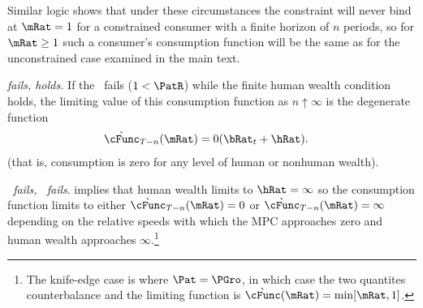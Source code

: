 \documentclass[\econtexRoot/BufferStockTheory]{subfiles}
\begin{document}
Similar logic shows that under these circumstances the constraint will
never bind at $\mRat=1$ for a constrained consumer with a finite horizon of $n$
periods, so for $\mRat \geq 1$ such a consumer's consumption function will be the same as for the
unconstrained case examined in the main text.

\hypertarget{cnclPFGICcnclRICFHWC}{}
\textit{{\RIC} fails, {\FHWC} holds.} If the \RIC~fails ($1 < \PatR$) while the finite human wealth condition
holds, the limiting value of this consumption function as $n \uparrow
\infty$ is the degenerate function
\begin{equation}\begin{gathered}\begin{aligned}
  \grave{\cFunc}_{T-n}(\mRat)  & = 0 (\bRat_{t}+\hRat).
\end{aligned}\end{gathered}\end{equation}
(that is, consumption is zero for any level of human or nonhuman wealth).

\hypertarget{cnclPFGICcnclRICcnclFHWC}{}
\textit{{\RIC}~fails, {\FHWC}~fails}. {\cncl{\FHWC}} implies that human wealth limits to $\hRat =
\infty$ so the consumption function limits to either
$\grave{\cFunc}_{T-n}(\mRat) = 0$ or
$\grave{\cFunc}_{T-n}(\mRat) = \infty$ depending on the relative
speeds with which the MPC approaches zero and human wealth approaches
$\infty$.\footnote{The knife-edge case is where $\Pat = \PGro$, in
  which case the two quantites counterbalance and the limiting
  function is $\grave{\cFunc}(\mRat)=\min[\mRat,1]$.}

\let\TableWidth\relax
\newlength\TableWidth
\end{document}
